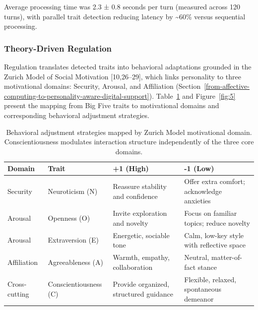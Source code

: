 Average processing time was 2.3 ± 0.8 seconds per turn (measured across 120 turns), with parallel trait detection reducing latency by \textasciitilde60\% versus sequential processing.

\subsubsection{Theory-Driven Regulation}\label{theory-driven-regulation}

Regulation translates detected traits into behavioral adaptations grounded in the Zurich Model of Social Motivation {[}10,26--29{]}, which links personality to three motivational domains: Security, Arousal, and Affiliation (Section~\ref{from-affective-computing-to-personality-aware-digital-support}). Table~\ref{tab:2} and Figure~\ref{fig:5} present the mapping from Big Five traits to motivational domains and corresponding behavioral adjustment strategies.



\begin{longtable}[]{@{}
  >{\raggedright\arraybackslash}p{}
  >{\raggedright\arraybackslash}p{}
  >{\raggedright\arraybackslash}p{}
  >{\raggedright\arraybackslash}p{}@{}}
\caption{Behavioral adjustment strategies mapped by Zurich Model motivational domain. Conscientiousness modulates interaction structure independently of the three core domains.}\label{tab:2}\\
\toprule\noalign{}
\begin{minipage}[b]{\linewidth}\raggedright
Domain
\end{minipage} & \begin{minipage}[b]{\linewidth}\raggedright
Trait
\end{minipage} & \begin{minipage}[b]{\linewidth}\raggedright
+1 (High)
\end{minipage} & \begin{minipage}[b]{\linewidth}\raggedright
-1 (Low)
\end{minipage} \\
\midrule\noalign{}
\endhead
\bottomrule\noalign{}
\endlastfoot
Security & Neuroticism (N) & Reassure stability and confidence & Offer extra comfort; acknowledge anxieties \\
Arousal & Openness (O) & Invite exploration and novelty & Focus on familiar topics; reduce novelty \\
Arousal & Extraversion (E) & Energetic, sociable tone & Calm, low-key style with reflective space \\
Affiliation & Agreeableness (A) & Warmth, empathy, collaboration & Neutral, matter-of-fact stance \\
Cross-cutting & Conscientiousness (C) & Provide organized, structured guidance & Flexible, relaxed, spontaneous demeanor \\
\end{longtable}

